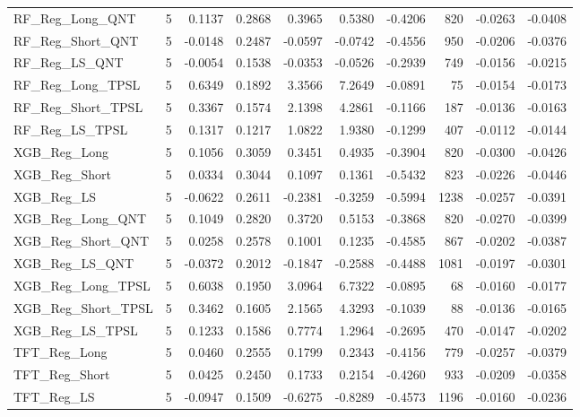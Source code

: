\begin{tabular}{llrrrrrrrr}
\cline{1-10}
RF\_Reg\_Long\_QNT & 5 & 0.1137 & 0.2868 & 0.3965 & 0.5380 & -0.4206 & 820 & -0.0263 & -0.0408 \\
\cline{1-10}
RF\_Reg\_Short\_QNT & 5 & -0.0148 & 0.2487 & -0.0597 & -0.0742 & -0.4556 & 950 & -0.0206 & -0.0376 \\
\cline{1-10}
RF\_Reg\_LS\_QNT & 5 & -0.0054 & 0.1538 & -0.0353 & -0.0526 & -0.2939 & 749 & -0.0156 & -0.0215 \\
\cline{1-10}
RF\_Reg\_Long\_TPSL & 5 & 0.6349 & 0.1892 & 3.3566 & 7.2649 & -0.0891 & 75 & -0.0154 & -0.0173 \\
\cline{1-10}
RF\_Reg\_Short\_TPSL & 5 & 0.3367 & 0.1574 & 2.1398 & 4.2861 & -0.1166 & 187 & -0.0136 & -0.0163 \\
\cline{1-10}
RF\_Reg\_LS\_TPSL & 5 & 0.1317 & 0.1217 & 1.0822 & 1.9380 & -0.1299 & 407 & -0.0112 & -0.0144 \\
\cline{1-10}
XGB\_Reg\_Long & 5 & 0.1056 & 0.3059 & 0.3451 & 0.4935 & -0.3904 & 820 & -0.0300 & -0.0426 \\
\cline{1-10}
XGB\_Reg\_Short & 5 & 0.0334 & 0.3044 & 0.1097 & 0.1361 & -0.5432 & 823 & -0.0226 & -0.0446 \\
\cline{1-10}
XGB\_Reg\_LS & 5 & -0.0622 & 0.2611 & -0.2381 & -0.3259 & -0.5994 & 1238 & -0.0257 & -0.0391 \\
\cline{1-10}
XGB\_Reg\_Long\_QNT & 5 & 0.1049 & 0.2820 & 0.3720 & 0.5153 & -0.3868 & 820 & -0.0270 & -0.0399 \\
\cline{1-10}
XGB\_Reg\_Short\_QNT & 5 & 0.0258 & 0.2578 & 0.1001 & 0.1235 & -0.4585 & 867 & -0.0202 & -0.0387 \\
\cline{1-10}
XGB\_Reg\_LS\_QNT & 5 & -0.0372 & 0.2012 & -0.1847 & -0.2588 & -0.4488 & 1081 & -0.0197 & -0.0301 \\
\cline{1-10}
XGB\_Reg\_Long\_TPSL & 5 & 0.6038 & 0.1950 & 3.0964 & 6.7322 & -0.0895 & 68 & -0.0160 & -0.0177 \\
\cline{1-10}
XGB\_Reg\_Short\_TPSL & 5 & 0.3462 & 0.1605 & 2.1565 & 4.3293 & -0.1039 & 88 & -0.0136 & -0.0165 \\
\cline{1-10}
XGB\_Reg\_LS\_TPSL & 5 & 0.1233 & 0.1586 & 0.7774 & 1.2964 & -0.2695 & 470 & -0.0147 & -0.0202 \\
\cline{1-10}
TFT\_Reg\_Long & 5 & 0.0460 & 0.2555 & 0.1799 & 0.2343 & -0.4156 & 779 & -0.0257 & -0.0379 \\
\cline{1-10}
TFT\_Reg\_Short & 5 & 0.0425 & 0.2450 & 0.1733 & 0.2154 & -0.4260 & 933 & -0.0209 & -0.0358 \\
\cline{1-10}
TFT\_Reg\_LS & 5 & -0.0947 & 0.1509 & -0.6275 & -0.8289 & -0.4573 & 1196 & -0.0160 & -0.0236 \\

\end{tabular}
